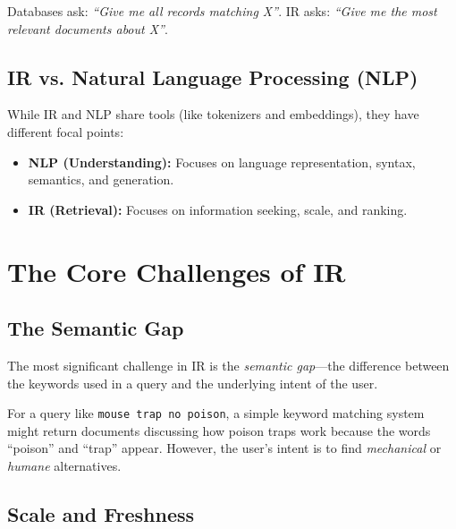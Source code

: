 \documentclass[11pt,a4paper]{article}
\theoremstyle{definition}
\theoremstyle{plain}
\begin{document}
\begin{keytakeaway}
Databases ask: \textit{``Give me all records matching X''}. IR asks: \textit{``Give me the most relevant documents about X''}.
\end{keytakeaway}

\subsection{IR vs. Natural Language Processing (NLP)}

While IR and NLP share tools (like tokenizers and embeddings), they have different focal points:
\begin{itemize}
    \item \textbf{NLP (Understanding):} Focuses on language representation, syntax, semantics, and generation.
    \item \textbf{IR (Retrieval):} Focuses on information seeking, scale, and ranking.
\end{itemize}

\section{The Core Challenges of IR}
\label{sec:challenges}

\subsection{The Semantic Gap}

The most significant challenge in IR is the \emph{semantic gap}---the difference between the keywords used in a query and the underlying intent of the user.

\begin{center}

\end{center}

For a query like \texttt{mouse trap no poison}, a simple keyword matching system might return documents discussing how poison traps work because the words ``poison'' and ``trap'' appear. However, the user's intent is to find \emph{mechanical} or \emph{humane} alternatives.

\subsection{Scale and Freshness}
\end{document}

